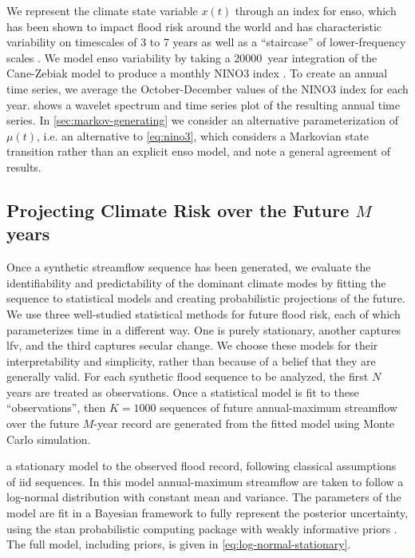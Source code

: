 \documentclass[
  draft,
  linenumbers
]{agujournal2018}
\makeatletter
\newcommand{\ie}{i.e.\@\xspace}
\makeatother
\begin{document}
We represent the climate state variable $x(t)$ through an index for \gls{enso}, which has been shown to impact flood risk around the world \citep{Ropelewski:1987do, Ward:2014gg} and has characteristic variability on timescales of 3 to 7 years \citep{Sarachik:2009dr} as well as a ``staircase'' of lower-frequency scales \citep{Jin:1994wq}.
We model \gls{enso} variability by taking a \SI{20000}{year} integration of the Cane-Zebiak model \citep{Zebiak:1987cl} to produce a monthly NINO3 index \citep{Ramesh:2016hf}.
To create an annual time series, we average the October-December values of the NINO3 index for each year.
 shows a wavelet spectrum and time series plot of the resulting annual time series.
In \cref{sec:markov-generating} we consider an alternative parameterization of $\mu(t)$, \ie an alternative to \cref{eq:nino3}, which considers a Markovian state transition rather than an explicit \gls{enso} model, and note a general agreement of results.

\subsection{Projecting Climate Risk over the Future $M$ years}\label{sec:methods-estimating}

Once a synthetic streamflow sequence has been generated, we evaluate the identifiability and predictability of the dominant climate modes by fitting the sequence to statistical models and creating probabilistic projections of the future.
We use three well-studied statistical methods for future flood risk, each of which parameterizes time in a different way.
One is purely stationary, another captures \gls{lfv}, and the third captures secular change.
We choose these models for their interpretability and simplicity, rather than because of a belief that they are generally valid.
For each synthetic flood sequence to be analyzed, the first $N$ years are treated as observations.
Once a statistical model is fit to these ``observations'', then $K=\num{1000}$ sequences of future annual-maximum streamflow over the future $M$-year record are generated from the fitted model using Monte Carlo simulation.

  a stationary model to the observed flood record, following classical assumptions of \gls{iid} sequences.
In this model annual-maximum streamflow are taken to follow a log-normal distribution with constant mean and variance.
The parameters of the model are fit  in a Bayesian framework to fully represent the posterior uncertainty, using the stan probabilistic computing package \citep{Carpenter:2017ke} with weakly informative priors \citep{gelman:2017,simpson:2017}.
The full model, including priors, is given in \cref{eq:log-normal-stationary}.
\end{document}

